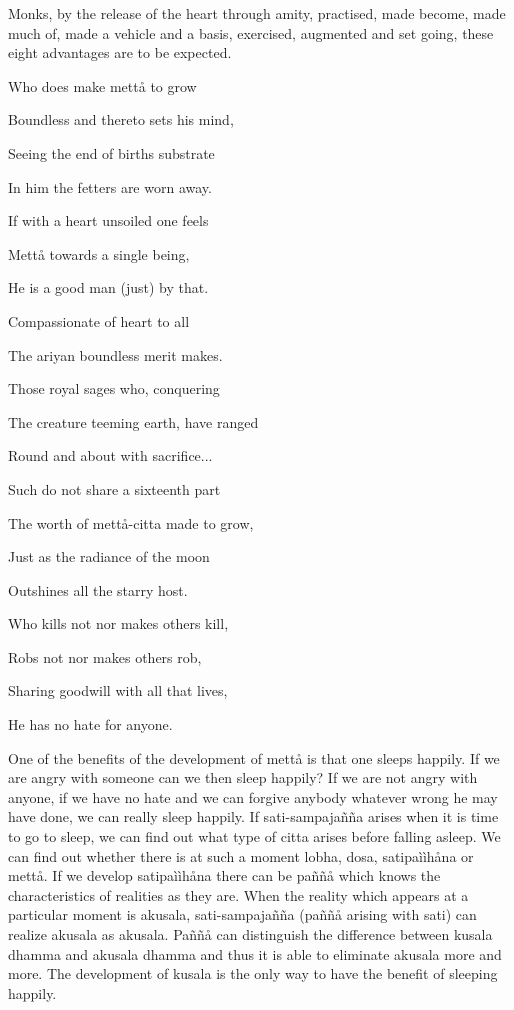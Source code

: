 \documentclass[12pt,twoside]{article}
\begin{document}
Monks, by the release of the heart through amity, practised, made
become, made much of, made a vehicle and a basis, exercised, augmented
and set going, these eight advantages are to be expected. 


\bigskip

Who does make mett{\aa} to grow

Boundless and thereto sets his mind,

Seeing the end of birth{\textquotesingle}s substrate

In him the fetters are worn away.

If with a heart unsoiled one feels

Mett{\aa} towards a single being, 

He is a good man (just) by that. 

Compassionate of heart to all

The ariyan boundless merit makes. 

Those royal sages who, conquering

The creature teeming earth, have ranged

Round and about with sacrifice...

Such do not share a sixteenth part

The worth of mett{\aa}{}-citta made to grow, 

Just as the radiance of the moon

Outshines all the starry host.

Who kills not nor makes others kill, 

Robs not nor makes others rob, 

Sharing goodwill with all that lives,

He has no hate for anyone. 


\bigskip

One of the benefits of the development of mett{\aa} is that one sleeps
happily. If we are angry with someone can we then sleep happily? If we
are not angry with anyone, if we have no hate and we can forgive
anybody whatever wrong he may have done, we can really sleep happily.
If sati{}-sampaja\~n\~na arises when it is time to go to sleep, we can
find out what type of citta arises before falling asleep. We can find
out whether there is at such a moment lobha, dosa, satipa\`i\`ih{\aa}na
or mett{\aa}. If we develop satipa\`i\`ih{\aa}na there can be
pa\~n\~n{\aa} which knows the characteristics of realities as they are.
When the reality which appears at a particular moment is akusala,
sati{}-sampaja\~n\~na (pa\~n\~n{\aa} arising with sati) can realize
akusala as akusala. Pa\~n\~n{\aa} can distinguish the difference
between kusala dhamma and akusala dhamma and thus it is able to
eliminate akusala more and more. The development of kusala is the only
way to have the benefit of sleeping happily. 
\end{document}
